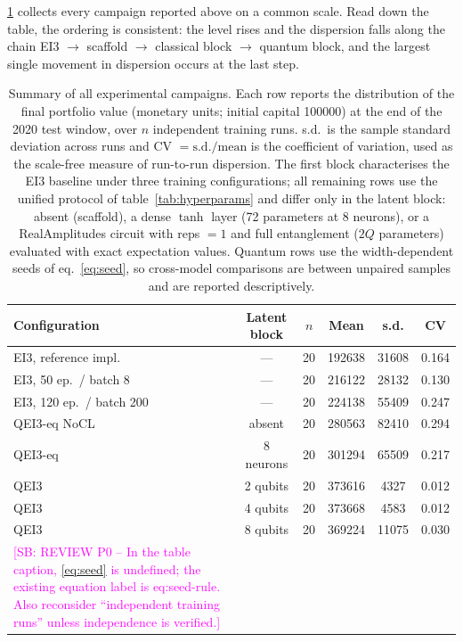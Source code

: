 \documentclass[aps,floatfix,superscriptaddress,twocolumn,tightenlines,amsmath,amssymb,nofootinbib,10pt,longbibliography,prl]{revtex4-2}
\newcommand{\sam}[1]{\textcolor{magenta}{[SB: {#1}]}}
\begin{document}
\ref{tab:summary} collects every campaign reported above on a common scale. Read down the table, the ordering is consistent: the level rises and the dispersion falls along the chain EI3 $\to$ scaffold $\to$ classical block $\to$ quantum block, and the largest single movement in dispersion occurs at the last step.
\begin{table}[htbp]
  \centering
  \caption{Summary of all experimental campaigns. Each row reports the distribution of the final portfolio value (monetary units; initial capital \num{100000}) at the end of the 2020 test window, over $n$ independent training runs. s.d.\ is the sample standard deviation across runs and CV $= \mathrm{s.d.}/\text{mean}$ is the coefficient of variation, used as the scale-free measure of run-to-run dispersion. The first block characterises the EI3 baseline under three training configurations; all remaining rows use the unified protocol of table~\ref{tab:hyperparams} and differ only in the latent block: absent (scaffold), a dense $\tanh$ layer (72 parameters at 8 neurons), or a RealAmplitudes circuit with reps $=1$ and full entanglement ($2Q$ parameters) evaluated with exact expectation values. Quantum rows use the width-dependent seeds of eq.~\eqref{eq:seed}, so cross-model comparisons are between unpaired samples and are reported descriptively.}
  \label{tab:summary}
  \begin{tabular}{lccccc}
    \toprule
    Configuration & Latent block & $n$ & Mean & s.d. & CV \\
    \midrule
    EI3, reference impl.      & ---        & 20 & \num{192638} & \num{31608} & 0.164 \\
    EI3, 50 ep.\ / batch 8    & ---        & 20 & \num{216122} & \num{28132} & 0.130 \\
    EI3, 120 ep.\ / batch 200 & ---        & 20 & \num{224138} & \num{55409} & 0.247 \\
    \midrule
    QEI3-eq NoCL              & absent     & 20 & \num{280563} & \num{82410} & 0.294 \\
    QEI3-eq                   & 8 neurons  & 20 & \num{301294} & \num{65509} & 0.217 \\
    \midrule
    QEI3                      & 2 qubits   & 20 & \num{373616} & \num{4327}  & 0.012 \\
    QEI3                      & 4 qubits   & 20 & \num{373668} & \num{4583}  & 0.012 \\
    QEI3                      & 8 qubits   & 20 & \num{369224} & \num{11075} & 0.030 \\
\sam{REVIEW P0 -- In the table caption, \string\eqref{eq:seed} is undefined; the existing equation label is eq:seed-rule. Also reconsider ``independent training runs'' unless independence is verified.}
    \bottomrule
  \end{tabular}
\end{table}
\end{document}

